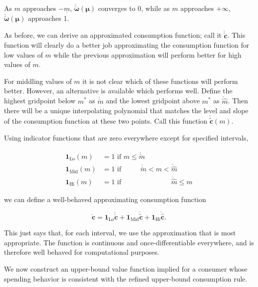 \documentclass[twocolumn, switch]{article}
\newcommand{\mNrm}{m}
\newcommand{\cFunc}{\mathbf{c}}
\newcommand{\cFuncApprox}{\grave{\cFunc}}
\newcommand{\mNrmMin}{\underline{\mNrm}}
\newcommand{\logmNrmEx}{\boldsymbol{\mu}}
\newcommand{\modRte}{\boldsymbol{\omega}}
\newcommand{\mNrmCusp}{\mNrm^*}
\newcommand{\modRteLoTightUpBd}{\grave{\check{\modRte}}}
\newcommand{\cFuncLoTightUpBd}{\grave{\check{\cFunc}}}
\newcommand{\mNrmLoTightUpBd}{\grave{\check{\mNrm}}}
\newcommand{\mNrmHiTightUpBd}{\grave{\hat{\mNrm}}}
\newcommand{\cFuncMidTightUpBd}{\grave{\tilde{\cFunc}}}
\newcommand{\indLo}{\mathbf{1}_{\text{Lo}}}
\newcommand{\indMid}{\mathbf{1}_{\text{Mid}}}
\newcommand{\indHi}{\mathbf{1}_{\text{Hi}}}
\newcommand{\cFuncHiTightUpBd}{\grave{\hat{\cFunc}}}
\begin{document}
As $\mNrm$ approaches $-\mNrmMin$, $\modRteLoTightUpBd(\logmNrmEx)$
converges to 0, while as $\mNrm$ approaches $+\infty$,
$\modRteLoTightUpBd(\logmNrmEx)$ approaches 1.

As before, we can derive an approximated consumption function; call it
$\cFuncLoTightUpBd$. This function will clearly do a better job approximating
the consumption function for low values of $\mNrm$ while the previous
approximation will perform better for high values of $\mNrm$.

For middling values of $\mNrm$ it is not clear which of these functions will
perform better. However, an alternative is available which performs well. Define
the highest gridpoint below $\mNrmCusp$ as $\mNrmLoTightUpBd$ and the lowest
gridpoint above $\mNrmCusp$ as $\mNrmHiTightUpBd$. Then there will be a unique
interpolating polynomial that matches the level and slope of the consumption
function at these two points. Call this function $\cFuncMidTightUpBd(\mNrm)$.

Using indicator functions that are zero everywhere except for specified
intervals,

\begin{equation}
\begin{aligned}
\indLo(\mNrm)  &= 1 \text{~if $\mNrm \leq \mNrmLoTightUpBd \phantom{< \mNrm < \mNrmHiTightUpBd \leq \mNrm}$} \\
\indMid(\mNrm) &= 1 \text{~if $\phantom{\mNrm \leq}~ \mNrmLoTightUpBd < \mNrm < \mNrmHiTightUpBd \phantom{\leq \mNrm}$} \\
\indHi(\mNrm)  &= 1 \text{~if $\phantom{\mNrm \leq ~\mNrmLoTightUpBd < \mNrm <} \mNrmHiTightUpBd \leq \mNrm$}
\end{aligned}
\end{equation}

we can define a well-behaved approximating consumption function

\begin{equation}
\cFuncApprox = \indLo \cFuncLoTightUpBd + \indMid \cFuncMidTightUpBd+\indHi \cFuncHiTightUpBd.
\end{equation}

This just says that, for each interval, we use the approximation that is most
appropriate. The function is continuous and once-differentiable everywhere, and
is therefore well behaved for computational purposes.

We now construct an upper-bound value function implied for a consumer whose
spending behavior is consistent with the refined upper-bound consumption rule.
\end{document}
